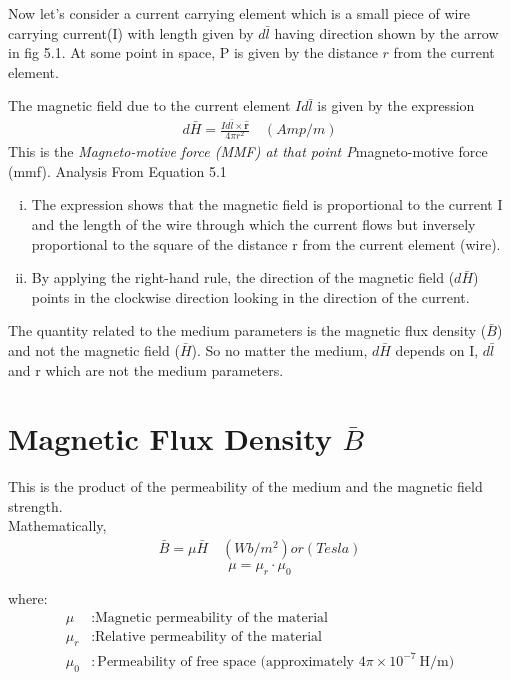 Now let's consider a current carrying element which is a small piece of wire carrying current(I) with length given by $d\bar{l}$ having direction shown by the arrow in fig 5.1. At some point in space, P is given by the distance $r$ from the current element.

The magnetic field due to the current element $Id\bar{l}$ is given by the expression
\begin{align}
	\boxed{d\bar{H}= \frac{Id\bar{l} \times \hat{\textbf{r}}}{4\pi r^{2}}}\quad (Amp/m)
\end{align} 
This is the \emph{Magneto-motive force (MMF) at that point P}magneto-motive force (mmf). Analysis From Equation 5.1
\begin{enumerate}[(i)]
	\item The expression shows that the magnetic field is proportional to the current I and the length of the wire through which the current flows but inversely proportional to the square of the distance r from the current element (wire).
	\item By applying the right-hand rule, the direction of the magnetic field ($d\bar{H}$) points in the clockwise direction looking in the direction of the current.
\end{enumerate}

The quantity related to the medium parameters is the magnetic flux density ($\bar{B}$) and not the magnetic field ($\bar{H}$). So no matter the medium, $ d\bar{H} $ depends on I, $ d\bar{l} $ and r which are not the medium parameters. 

\section{Magnetic Flux Density $\bar{B}$}
This is the product of the permeability of the medium and the magnetic field strength.\\
Mathematically, 
\begin{align}
	\boxed{\bar{B} = \mu\bar{H}}\quad (Wb/m^{2}) or (Tesla)
\end{align}
\[
\mu = \mu_r \cdot \mu_0
\]

where:
\begin{align*}
	\mu & : \text{Magnetic permeability of the material} \\
	\mu_r & : \text{Relative permeability of the material} \\
	\mu_0 & : \text{Permeability of free space (approximately } 4\pi \times 10^{-7} \ \text{H/m)}
\end{align*}


